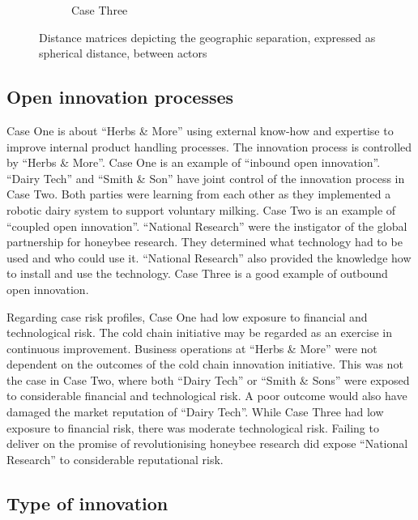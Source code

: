 \begin{landscape}
\begin{figure}
\begin{subfigure}[b]{0.5\textwidth}
        \caption{Case Three}
        \label{proximity_c3}
    \end{subfigure}
    \caption{Distance matrices depicting the geographic separation, expressed as spherical distance, between actors}
    \label{fig:spherical}
\end{figure}
\end{landscape}

\subsection{Open innovation processes}

Case One is about \enquote{Herbs \& More} using external know-how and expertise to improve internal product handling processes. The innovation process is controlled by \enquote{Herbs \& More}. Case One is an example of \enquote{inbound open innovation}. \enquote{Dairy Tech} and \enquote{Smith \& Son} have joint control of the innovation process in Case Two. Both parties were learning from each other as they implemented a robotic dairy system to support voluntary milking. Case Two is an example of \enquote{coupled open innovation}. \enquote{National Research} were the instigator of the global partnership for honeybee research. They determined what technology had to be used and who could use it. \enquote{National Research} also provided the knowledge how to install and use the technology. Case Three is a good example of outbound open innovation. \medskip

Regarding case risk profiles, Case One had low exposure to financial and technological risk. The cold chain initiative may be regarded as an exercise in continuous improvement. Business operations at \enquote{Herbs \& More} were not dependent on the outcomes of the cold chain innovation initiative. This was not the case in Case Two, where both \enquote{Dairy Tech} or \enquote{Smith \& Sons} were exposed to considerable financial and technological risk. A poor outcome would also have damaged the market reputation of \enquote{Dairy Tech}. While Case Three had low exposure to financial risk, there was moderate technological risk. Failing to deliver on the promise of revolutionising honeybee research did expose \enquote{National Research} to considerable reputational risk. \medskip 

\subsection{Type of innovation}

